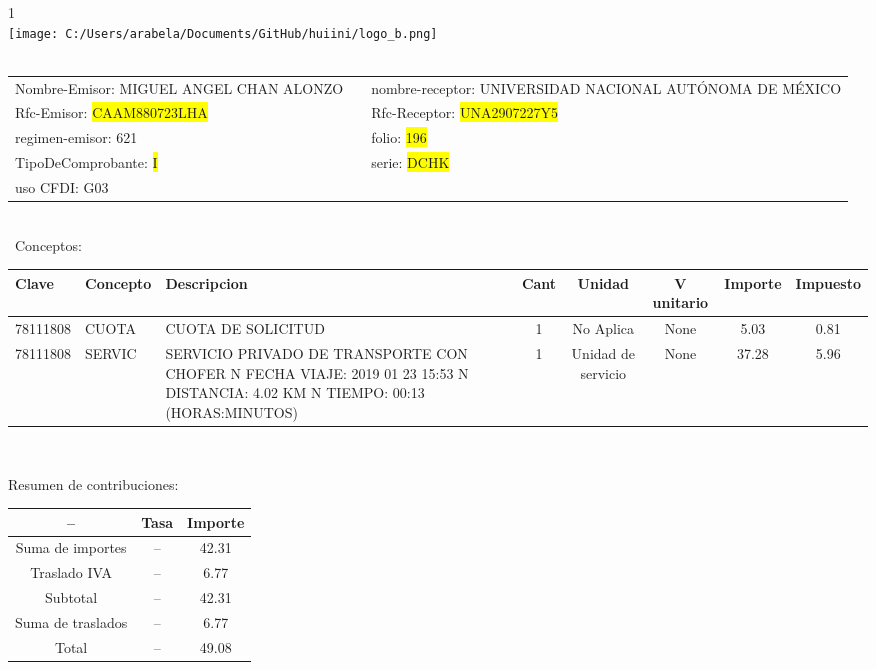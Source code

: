 \documentclass{article}
\begin{document}
\hspace{18cm} 1\\
\texttt{[image: C:/Users/arabela/Documents/GitHub/huiini/logo\_b.png]}
\bigskip\\\
\begin{tabular}{p{11cm}p{1cm}p{8cm}}

Nombre-Emisor: MIGUEL ANGEL CHAN ALONZO && nombre-receptor: UNIVERSIDAD NACIONAL AUTÓNOMA DE MÉXICO\\

Rfc-Emisor: \colorbox{yellow}{ CAAM880723LHA } & & Rfc-Receptor: \colorbox{yellow}{ UNA2907227Y5 }\\

regimen-emisor: 621 & & folio: \colorbox{yellow}{ 196 }\\

TipoDeComprobante: \colorbox{yellow}{ I } & & serie: \colorbox{yellow}{ DCHK }\\

uso CFDI: G03\\



\end{tabular}
\bigskip\bigskip\bigskip\\\
Conceptos:\\
\begin{tabular}{|p{1.5cm}|p{3.6cm}|p{3.6cm}|c|c|c|c|c|}
\hline
Clave & Concepto & Descripcion & Cant & Unidad & V unitario & Importe & Impuesto \\
\hline

78111808 & CUOTA  & CUOTA DE SOLICITUD & 1 & No Aplica & None & 5.03 &  0.81 \\
\hline

78111808 & SERVIC & SERVICIO PRIVADO DE TRANSPORTE CON CHOFER  N FECHA VIAJE: 2019 01 23 15:53  N DISTANCIA: 4.02 KM  N TIEMPO: 00:13 (HORAS:MINUTOS) & 1 & Unidad de servicio & None & 37.28 &  5.96 \\
\hline

\end{tabular}\\
\bigskip
\begin{center}
Resumen de contribuciones:\\
\bigskip
\begin{tabular}{|c|c|c|}
\hline
 -- & Tasa & Importe\\
\hline

Suma de importes & -- & 42.31 \\
\hline

Traslado IVA & -- & 6.77 \\
\hline

Subtotal  & -- & 42.31 \\
\hline

Suma de traslados & -- & 6.77 \\
\hline

Total  & -- & 49.08 \\
\hline

\end{tabular}
\end{center}
\end{document}
